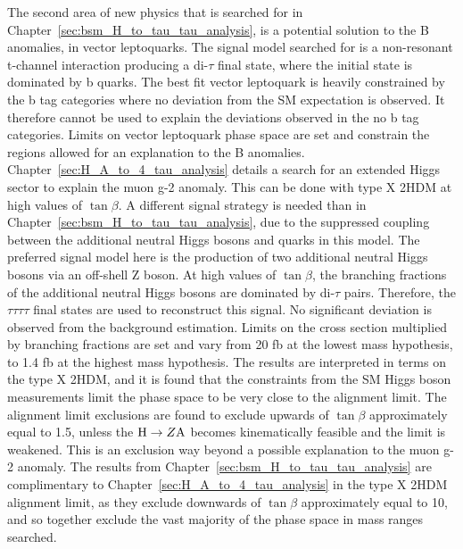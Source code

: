 The second area of new physics that is searched for in Chapter~\ref{sec:bsm_H_to_tau_tau_analysis}, is a potential solution to the B anomalies, in vector leptoquarks.
The signal model searched for is a non-resonant t-channel interaction producing a di-$\tau$ final state, where the initial state is dominated by b quarks.
The best fit vector leptoquark is heavily constrained by the b tag categories where no deviation from the \ac{SM} expectation is observed.
It therefore cannot be used to explain the deviations observed in the no b tag categories.
Limits on vector leptoquark phase space are set and constrain the regions allowed for an explanation to the B anomalies. \\

Chapter~\ref{sec:H_A_to_4_tau_analysis} details a search for an extended Higgs sector to explain the muon g-2 anomaly.
This can be done with type X \ac{2HDM} at high values of $\tan\beta$.
A different signal strategy is needed than in Chapter~\ref{sec:bsm_H_to_tau_tau_analysis}, due to the suppressed coupling between the additional neutral Higgs bosons and quarks in this model.
The preferred signal model here is the production of two additional neutral Higgs bosons via an off-shell Z boson.
At high values of $\tan\beta$, the branching fractions of the additional neutral Higgs bosons are dominated by di-$\tau$ pairs.
Therefore, the $\tau\tau\tau\tau$ final states are used to reconstruct this signal.
No significant deviation is observed from the background estimation.
Limits on the cross section multiplied by branching fractions are set and vary from 20 fb at the lowest mass hypothesis, to 1.4 fb at the highest mass hypothesis.
The results are interpreted in terms on the type X \ac{2HDM}, and it is found that the constraints from the \ac{SM} Higgs boson measurements limit the phase space to be very close to the alignment limit.
The alignment limit exclusions are found to exclude upwards of $\tan\beta$ approximately equal to 1.5, unless the ${\text{H}} \rightarrow Z{\text{A}}$ becomes kinematically feasible and the limit is weakened.
This is an exclusion way beyond a possible explanation to the muon g-2 anomaly.
The results from Chapter~\ref{sec:bsm_H_to_tau_tau_analysis} are complimentary to Chapter~\ref{sec:H_A_to_4_tau_analysis} in the type X \ac{2HDM} alignment limit, as they exclude downwards of $\tan\beta$ approximately equal to 10, and so together exclude the vast majority of the phase space in mass ranges searched.

